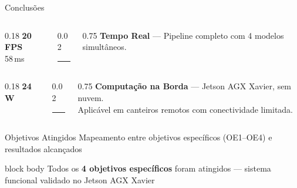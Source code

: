 \begin{frame}{Conclusões}
  \begin{columns}[c]
    \begin{column}{0.18\textwidth}
      \raggedleft
      {\fontsize{20}{22}\selectfont\textcolor{neckcolor}{\textbf{20\,\scriptsize{FPS}}}}\\[-2pt]
      {\scriptsize\textcolor{neckcolor}{58\,ms}}
    \end{column}
    \begin{column}{0.02\textwidth}
      \centering
      \textcolor{arrowcolor}{\rule{0.4pt}{1.5em}}
    \end{column}
    \begin{column}{0.75\textwidth}
      {\small\textbf{Tempo Real} --- Pipeline completo com 4 modelos simultâneos.}
    \end{column}
  \end{columns}

  \vspace{3mm}

  \begin{columns}[c]
    \begin{column}{0.18\textwidth}
      \raggedleft
      {\fontsize{26}{28}\selectfont\textcolor{outputcolor}{\textbf{24\,\scriptsize{W}}}}
    \end{column}
    \begin{column}{0.02\textwidth}
      \centering
      \textcolor{arrowcolor}{\rule{0.4pt}{1.5em}}
    \end{column}
    \begin{column}{0.75\textwidth}
      {\small\textbf{Computação na Borda} --- Jetson AGX Xavier, sem nuvem.\\
      Aplicável em canteiros remotos com conectividade limitada.}
    \end{column}
  \end{columns}

  \vfill
\end{frame}

\begin{frame}{Objetivos Atingidos}
  \vspace{-2mm}
  {\small\color{sublabelcolor}%
    Mapeamento entre objetivos espec\'{i}ficos (OE1--OE4) e resultados alcan\c{c}ados}

  \vfill
  \begin{center}
    \resizebox{0.95\textwidth}{!}{}
  \end{center}
  \vfill

  \begin{beamercolorbox}[wd=\textwidth, rounded=true, shadow=false]{block body}
    \centering
    {\footnotesize\color{stagecolor}%
      Todos os \textbf{4 objetivos espec\'{i}ficos} foram atingidos --- sistema funcional validado no Jetson AGX Xavier}
  \end{beamercolorbox}
\end{frame}

